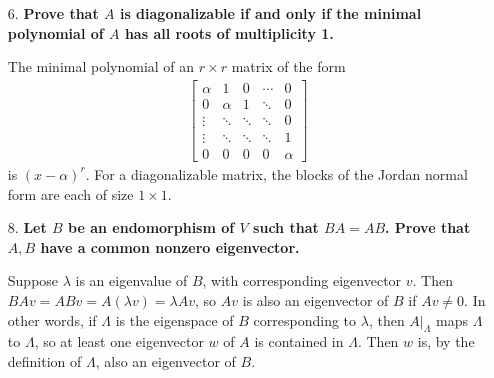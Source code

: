 \documentclass[12pt]{article}
\begin{document}
\begin{enumerate}
    \item[6.]
        \boldmath\textbf{Prove that $A$ is diagonalizable if and only if the minimal polynomial of $A$ has all roots of multiplicity 1.
        }\unboldmath \par
        The minimal polynomial of an $r \times r$ matrix of the form
        \begin{align*}
            \left[ \begin{array}{ccccc}
                \alpha & 1 & 0 & \cdots & 0 \\
                0 & \alpha & 1 & \ddots & 0 \\
                \vdots & \ddots & \ddots & \ddots & 0 \\
                \vdots & \ddots & \ddots & \ddots & 1 \\
                0 & 0 & 0 & 0 & \alpha
            \end{array} \right]
        \end{align*}
        is $(x - \alpha)^r$. For a diagonalizable matrix, the blocks of the Jordan normal form are each of size $1 \times 1$.

    \item[8.]
        \boldmath\textbf{Let $B$ be an endomorphism of $V$ such that $BA = AB$. Prove that $A, B$ have a common nonzero eigenvector.
        }\unboldmath \par
        Suppose $\lambda$ is an eigenvalue of $B$, with corresponding eigenvector $v$. Then $BAv = ABv = A(\lambda v) = \lambda Av$, so $Av$ is also an eigenvector of $B$ if $Av \neq 0$. In other words, if $\Lambda$ is the eigenspace of $B$ corresponding to $\lambda$, then $A|_{\Lambda}$ maps $\Lambda$ to $\Lambda$, so at least one eigenvector $w$ of $A$ is contained in $\Lambda$. Then $w$ is, by the definition of $\Lambda$, also an eigenvector of $B$.


\end{enumerate}
\end{document}
